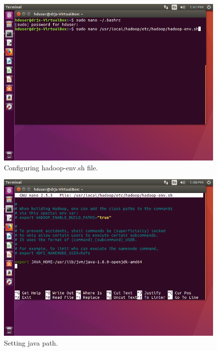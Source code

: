 \documentclass[a4paper,10pt]{article}
\begin{document}
\begin{figure}[h]
	\includegraphics[scale=0.33,center]{6.png}
	\caption{Configuring hadoop-env.sh file.}
	\label{fig:1}
\end{figure}

\begin{figure}[h]
	\includegraphics[scale=0.33,center]{7.png}
	\caption{Setting java path.}
	\label{fig:1}
\end{figure}
\end{document}
